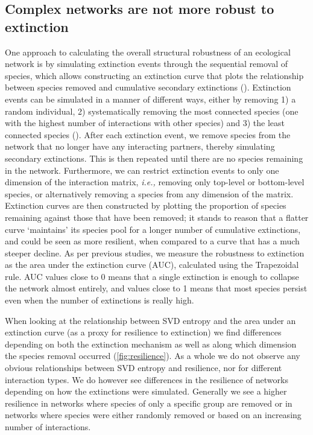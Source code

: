 \begin{refsection}
\subsection{Complex networks are not more robust to
extinction}\label{complex-networks-are-not-more-robust-to-extinction}

One approach to calculating the overall structural robustness of an ecological
network is by simulating extinction events through the sequential removal of
species, which allows constructing an extinction curve that plots the
relationship between species removed and cumulative secondary extinctions
(\cite{Dunne2002NetStr, Memmott2004TolPol}). Extinction events can be simulated in
a manner of different ways, either by removing 1) a random individual, 2)
systematically removing the most connected species (one with the highest number
of interactions with other species) and 3) the least connected species
(\cite{Dunne2002NetStr}). After each extinction event, we remove species from the
network that no longer have any interacting partners, thereby simulating
secondary extinctions. This is then repeated until there are no species
remaining in the network. Furthermore, we can restrict extinction events to only
one dimension of the interaction matrix, \emph{i.e.,} removing only top-level or
bottom-level species, or alternatively removing a species from any dimension of
the matrix. Extinction curves are then constructed by plotting the proportion of
species remaining against those that have been removed; it stands to reason that
a flatter curve `maintains' its species pool for a longer number of cumulative
extinctions, and could be seen as more resilient, when compared to a curve that
has a much steeper decline. As per previous studies, we measure the robustness
to extinction as the area under the extinction curve (AUC), calculated using the
Trapezoidal rule. AUC values close to 0 means that a single extinction is enough
to collapse the network almost entirely, and values close to 1 means that most
species persist even when the number of extinctions is really high.

When looking at the relationship between SVD entropy and the area under an
extinction curve (as a proxy for resilience to extinction) we find differences
depending on both the extinction mechanism as well as along which dimension the
species removal occurred (\autoref{fig:resilience}). As a whole we do not
observe any obvious relationships between SVD entropy and resilience, nor for
different interaction types. We do however see differences in the resilience of
networks depending on how the extinctions were simulated. Generally we see a
higher resilience in networks where species of only a specific group are removed
or in networks where species were either randomly removed or based on an
increasing number of interactions.


\end{refsection}
